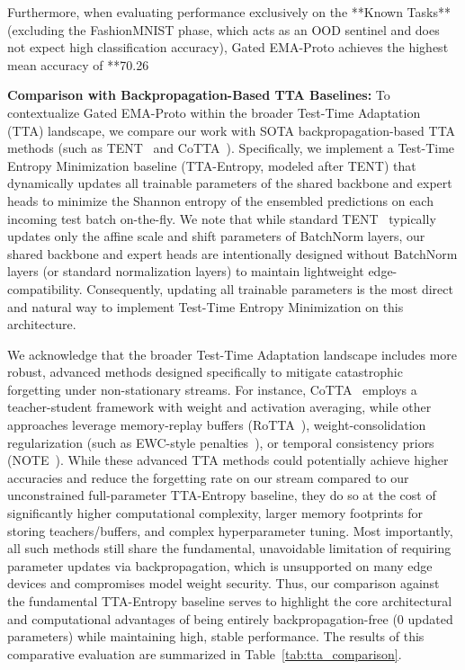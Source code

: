 \documentclass{article}
\theoremstyle{plain}
\theoremstyle{definition}
\theoremstyle{remark}
\begin{document}
Furthermore, when evaluating performance exclusively on the **Known Tasks** (excluding the FashionMNIST phase, which acts as an OOD sentinel and does not expect high classification accuracy), Gated EMA-Proto achieves the highest mean accuracy of **70.26%

\textbf{Comparison with Backpropagation-Based TTA Baselines:} To contextualize Gated EMA-Proto within the broader Test-Time Adaptation (TTA) landscape, we compare our work with SOTA backpropagation-based TTA methods (such as TENT~\cite{tent} and CoTTA~\cite{cotta}). Specifically, we implement a Test-Time Entropy Minimization baseline (TTA-Entropy, modeled after TENT) that dynamically updates all trainable parameters of the shared backbone and expert heads to minimize the Shannon entropy of the ensembled predictions on each incoming test batch on-the-fly. We note that while standard TENT~\cite{tent} typically updates only the affine scale and shift parameters of BatchNorm layers, our shared backbone and expert heads are intentionally designed without BatchNorm layers (or standard normalization layers) to maintain lightweight edge-compatibility. Consequently, updating all trainable parameters is the most direct and natural way to implement Test-Time Entropy Minimization on this architecture. 

We acknowledge that the broader Test-Time Adaptation landscape includes more robust, advanced methods designed specifically to mitigate catastrophic forgetting under non-stationary streams. For instance, CoTTA~\cite{cotta} employs a teacher-student framework with weight and activation averaging, while other approaches leverage memory-replay buffers (RoTTA~\cite{rotta}), weight-consolidation regularization (such as EWC-style penalties~\cite{eata}), or temporal consistency priors (NOTE~\cite{note_tta_2022}). While these advanced TTA methods could potentially achieve higher accuracies and reduce the forgetting rate on our stream compared to our unconstrained full-parameter TTA-Entropy baseline, they do so at the cost of significantly higher computational complexity, larger memory footprints for storing teachers/buffers, and complex hyperparameter tuning. Most importantly, all such methods still share the fundamental, unavoidable limitation of requiring parameter updates via backpropagation, which is unsupported on many edge devices and compromises model weight security. Thus, our comparison against the fundamental TTA-Entropy baseline serves to highlight the core architectural and computational advantages of being entirely backpropagation-free (0 updated parameters) while maintaining high, stable performance. The results of this comparative evaluation are summarized in Table~\ref{tab:tta_comparison}.
\end{document}
